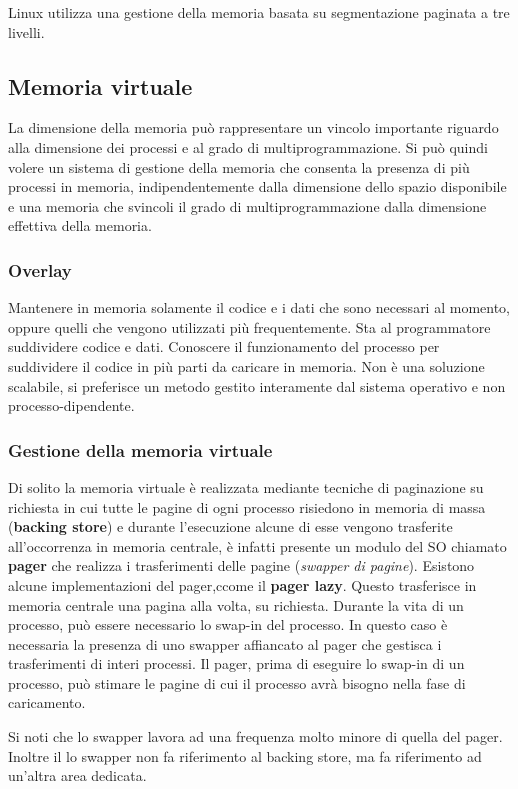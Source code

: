 \documentclass{article}
\begin{document}
\noindent Linux utilizza una gestione della memoria basata su segmentazione paginata a tre livelli.

\subsection{Memoria virtuale}
\noindent La dimensione della memoria può rappresentare un vincolo importante riguardo alla dimensione dei processi e al grado di multiprogrammazione.
Si può quindi volere un sistema di gestione della memoria che consenta la presenza di più processi in memoria, indipendentemente dalla dimensione dello 
spazio disponibile e una memoria che svincoli il grado di multiprogrammazione dalla dimensione effettiva della memoria. 
\subsubsection{Overlay}
\noindent Mantenere in memoria solamente il codice e i dati che sono necessari al momento, oppure quelli che vengono utilizzati più frequentemente. 
Sta al programmatore suddividere codice e dati.
Conoscere il funzionamento del processo per suddividere il codice in più parti da caricare in memoria. Non è una soluzione scalabile, si preferisce un
metodo gestito interamente dal sistema operativo e non processo-dipendente.

\subsubsection{Gestione della memoria virtuale}
\noindent Di solito la memoria virtuale è realizzata mediante tecniche di paginazione su richiesta in cui tutte le pagine di ogni processo risiedono 
in memoria di massa (\textbf{backing store}) e durante l'esecuzione alcune di esse vengono trasferite all'occorrenza in memoria centrale, è infatti
presente un modulo del SO chiamato \textbf{pager} che realizza i trasferimenti delle pagine (\textit{swapper di pagine}).
Esistono alcune implementazioni del pager,ccome il \textbf{pager lazy}. Questo trasferisce in memoria centrale una pagina alla volta, su richiesta. 
Durante la vita di un processo, può essere necessario lo swap-in del processo. In questo caso è necessaria la presenza di uno swapper affiancato al pager che
gestisca i trasferimenti di interi processi. Il pager, prima di eseguire lo swap-in di un processo, può stimare le pagine di cui il processo avrà bisogno nella
fase di caricamento. 

\noindent Si noti che lo swapper lavora ad una frequenza molto minore di quella del pager. Inoltre il lo swapper non fa riferimento al backing store, ma fa riferimento 
ad un'altra area dedicata.
\medskip
\end{document}
